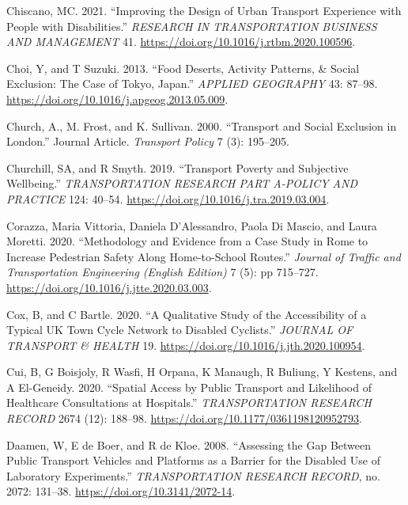 \documentclass[12pt, oneside]{report}
\newlength{\cslhangindent}
\newlength{\cslentryspacingunit} %
\newenvironment{CSLReferences}[2] %
 {%
  \setlength{\parindent}{0pt}
  \ifodd #1
  \let\oldpar\par
  \def\par{\hangindent=\cslhangindent\oldpar}
  \fi
  \setlength{\parskip}{#2\cslentryspacingunit}
 }%
 {}
\begin{document}
\begin{CSLReferences}{1}{0}
\leavevmode{}%
Chiscano, MC. 2021. {``Improving the Design of Urban Transport
Experience with People with Disabilities.''} \emph{RESEARCH IN
TRANSPORTATION BUSINESS AND MANAGEMENT} 41.
\url{https://doi.org/10.1016/j.rtbm.2020.100596}.

\leavevmode{}%
Choi, Y, and T Suzuki. 2013. {``Food Deserts, Activity Patterns, \&
Social Exclusion: {The} Case of {Tokyo}, {Japan}.''} \emph{APPLIED
GEOGRAPHY} 43: 87--98.
\url{https://doi.org/10.1016/j.apgeog.2013.05.009}.

\leavevmode{}%
Church, A., M. Frost, and K. Sullivan. 2000. {``Transport and Social
Exclusion in London.''} Journal Article. \emph{Transport Policy} 7 (3):
195--205.

\leavevmode{}%
Churchill, SA, and R Smyth. 2019. {``Transport Poverty and Subjective
Wellbeing.''} \emph{TRANSPORTATION RESEARCH PART A-POLICY AND PRACTICE}
124: 40--54. \url{https://doi.org/10.1016/j.tra.2019.03.004}.

\leavevmode{}%
Corazza, Maria Vittoria, Daniela D'Alessandro, Paola Di Mascio, and
Laura Moretti. 2020. {``Methodology and Evidence from a Case Study in
{Rome} to Increase Pedestrian Safety Along Home-to-School Routes.''}
\emph{Journal of Traffic and Transportation Engineering (English
Edition)} 7 (5): pp 715--727.
\url{https://doi.org/10.1016/j.jtte.2020.03.003}.

\leavevmode{}%
Cox, B, and C Bartle. 2020. {``A Qualitative Study of the Accessibility
of a Typical {UK} Town Cycle Network to Disabled Cyclists.''}
\emph{JOURNAL OF TRANSPORT \& HEALTH} 19.
\url{https://doi.org/10.1016/j.jth.2020.100954}.

\leavevmode{}%
Cui, B, G Boisjoly, R Wasfi, H Orpana, K Manaugh, R Buliung, Y Kestens,
and A El-Geneidy. 2020. {``Spatial {Access} by {Public Transport} and
{Likelihood} of {Healthcare Consultations} at {Hospitals}.''}
\emph{TRANSPORTATION RESEARCH RECORD} 2674 (12): 188--98.
\url{https://doi.org/10.1177/0361198120952793}.

\leavevmode{}%
Daamen, W, E de Boer, and R de Kloe. 2008. {``Assessing the {Gap Between
Public Transport Vehicles} and {Platforms} as a {Barrier} for the
{Disabled Use} of {Laboratory Experiments}.''} \emph{TRANSPORTATION
RESEARCH RECORD}, no. 2072: 131--38.
\url{https://doi.org/10.3141/2072-14}.


\end{CSLReferences}
\end{document}
